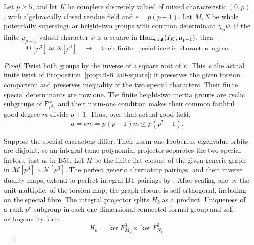\begin{proposition}
\label{prop:B-RD77-square}
Let \(p\ge5\), and let \(K\) be complete discretely valued
of mixed characteristic \((0,p)\), with algebraically closed
residue field and \(e=p(p-1)\). Let \(M,N\) be whole
potentially supersingular height-two groups with common
determinant \(\chi_p\psi\). If the finite
\(\mu_{p-1}\)-valued character \(\psi\) is a square in
\(\operatorname{Hom}_{\rm cont}(I_K,\mu_{p-1})\), then
\[
             M[p^3]\simeq N[p^3]
   \quad\Longrightarrow\quad
   \text{their finite special inertia characters agree}.
                                                        \tag{B-RD77.4}
\]
\end{proposition}
\begin{proof}
Twist both groups by the inverse of a square root of \(\psi\).
This is the actual finite twist of
Proposition~\ref{prop:B-RD50-square}; it preserves the given
torsion comparison and preserves inequality of the two special
characters. Their finite special determinants are now one.
The finite height-two inertia groups are cyclic subgroups of
\(\mathbf F_{p^2}^{\times}\), and their norm-one condition
makes their common faithful good degree \(m\) divide \(p+1\).
Thus, over that actual good field,
\[
             a=em=p(p-1)m\le p(p^2-1).               \tag{B-RD77.5}
\]

Suppose the special characters differ. Their norm-one
Frobenius eigenvalue orbits are disjoint, so an integral tame
polynomial projector separates the two special factors, just
as in B50. Let \(H\) be the finite-flat closure of the given
generic graph in \(\mathcal M[p^3]\times\mathcal N[p^3]\).
The perfect generic alternating pairings, and their inverse
duality maps, extend to perfect integral BT pairings by
\cite[Theorem~4 and Corollaries~1--2, p.~181]{Tate1967PDivisible}.
After scaling one by the unit multiplier of the torsion map,
the graph closure is self-orthogonal, including on the special
fibre. The integral projector splits \(H_k\) as a product.
Uniqueness of a rank-\(p^r\) subgroup in each one-dimensional
connected formal group and self-orthogonality force
\[
            H_k=\ker F_{M_k}^{3}\times\ker F_{N_k}^{3}.
                                                        \tag{B-RD77.6}
\]


\end{proof}
